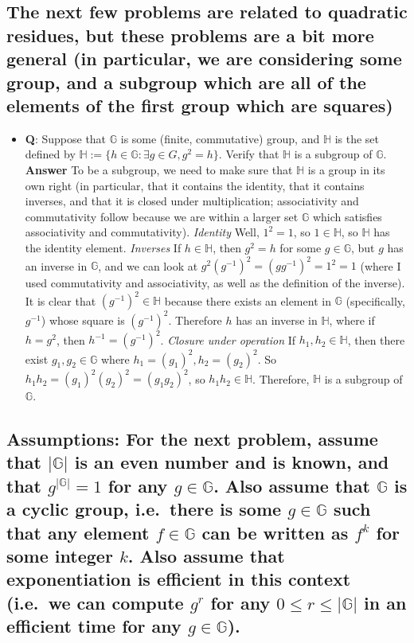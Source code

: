 \subsection{The next few problems are related to quadratic residues, but
these problems are a bit more general (in particular, we are considering
some group, and a subgroup which are all of the elements of the first
group which are squares)}\label{The-next-few-problems-are}

\begin{itemize}
\tightlist
\item
  \textbf{Q}: Suppose that \(\mathbb{G}\) is some (finite, commutative)
  group, and \(\mathbb{H}\) is the set defined by
  \(\mathbb{H} := \{ h \in \mathbb{G}: \exists g \in G, g^2 = h\}\).
  Verify that \(\mathbb{H}\) is a subgroup of \(\mathbb{G}\).
  \textbf{Answer} To be a subgroup, we need to make sure that
  \(\mathbb{H}\) is a group in its own right (in particular, that it
  contains the identity, that it contains inverses, and that it is
  closed under multiplication; associativity and commutativity follow
  because we are within a larger set \(\mathbb{G}\) which satisfies
  associativity and commutativity). \emph{Identity} Well, \(1^2 = 1\),
  so \(1 \in \mathbb{H}\), so \(\mathbb{H}\) has the identity element.
  \emph{Inverses} If \(h \in \mathbb{H}\), then \(g^2 = h\) for some
  \(g \in \mathbb{G}\), but \(g\) has an inverse in \(\mathbb{G}\), and
  we can look at \(g^2(g^{-1})^2 = (gg^{-1})^2 = 1^2 = 1\) (where I used
  commutativity and associativity, as well as the definition of the
  inverse). It is clear that \((g^{-1})^2 \in \mathbb{H}\) because there
  exists an element in \(\mathbb{G}\) (specifically, \(g^{-1}\)) whose
  square is \((g^{-1})^2\). Therefore \(h\) has an inverse in
  \(\mathbb{H}\), where if \(h=g^2\), then \(h^{-1} = (g^{-1})^2\).
  \emph{Closure under operation} If \(h_1,h_2 \in \mathbb{H}\), then
  there exist \(g_1,g_2 \in \mathbb{G}\) where
  \(h_1 = (g_1)^2, h_2 = (g_2)^2\). So
  \(h_1h_2 = (g_1)^2(g_2)^2 = (g_1g_2)^2\), so
  \(h_1h_2 \in \mathbb{H}\). Therefore, \(\mathbb{H}\) is a subgroup of
  \(\mathbb{G}\).
\end{itemize}

\subsection{\textbf{Assumptions:} For the next problem, assume that
\(|\mathbb{G}|\) is an even number and is known, and that
\(g^{|\mathbb{G}|}=1\) for any \(g \in \mathbb{G}\). Also assume that
\(\mathbb{G}\) is a cyclic group, i.e.~there is some
\(g \in \mathbb{G}\) such that any element \(f \in \mathbb{G}\) can be
written as \(f^k\) for some integer \(k\). Also assume that
exponentiation is efficient in this context (i.e.~we can compute \(g^r\)
for any \(0 \leq r \leq |\mathbb{G}|\) in an efficient time for any
\(g \in \mathbb{G}\)).}\label{Assumptions-For-the-next-}

